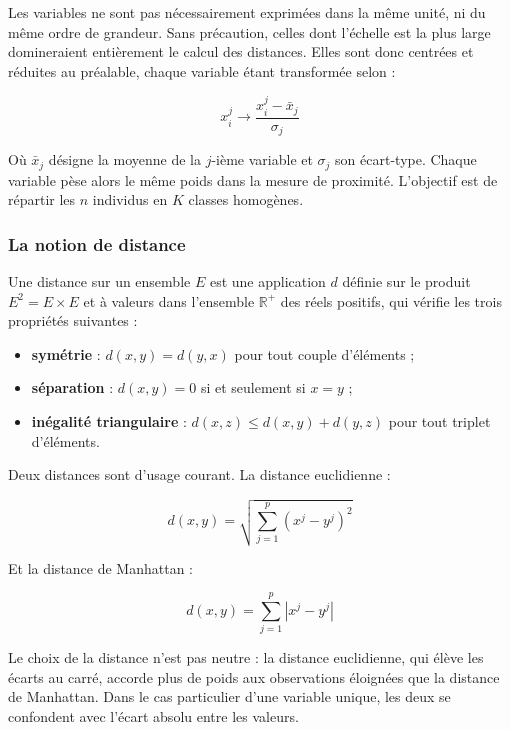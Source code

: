Les variables ne sont pas nécessairement exprimées dans la même unité, ni du même ordre de grandeur. Sans précaution, celles dont l'échelle est la plus large domineraient entièrement le calcul des distances. Elles sont donc centrées et réduites au préalable, chaque variable étant transformée selon :

\begin{equation}
    x_i^j \longrightarrow \frac{x_i^j - \bar{x}_j}{\sigma_j}
\end{equation}

Où $\bar{x}_j$ désigne la moyenne de la $j$-ième variable et $\sigma_j$ son écart-type. Chaque variable pèse alors le même poids dans la mesure de proximité. L'objectif est de répartir les $n$ individus en $K$ classes homogènes.

\subsubsection*{La notion de distance}

Une distance sur un ensemble $E$ est une application $d$ définie sur le produit $E^2 = E \times E$ et à valeurs dans l'ensemble $\mathbb{R}^+$ des réels positifs, qui vérifie les trois propriétés suivantes :

\begin{itemize}[label=$\bullet$]
    \item \textbf{symétrie} : $d(x, y) = d(y, x)$ pour tout couple d'éléments ;
    \item \textbf{séparation} : $d(x, y) = 0$ si et seulement si $x = y$ ;
    \item \textbf{inégalité triangulaire} : $d(x, z) \leq d(x, y) + d(y, z)$ pour tout triplet d'éléments.
\end{itemize}

Deux distances sont d'usage courant. La distance euclidienne :

\begin{equation}
    d(x, y) = \sqrt{\sum_{j=1}^{p} (x^j - y^j)^2}
\end{equation}

Et la distance de Manhattan :

\begin{equation}
    d(x, y) = \sum_{j=1}^{p} \left| x^j - y^j \right|
\end{equation}

Le choix de la distance n'est pas neutre : la distance euclidienne, qui élève les écarts au carré, accorde plus de poids aux observations éloignées que la distance de Manhattan. Dans le cas particulier d'une variable unique, les deux se confondent avec l'écart absolu entre les valeurs.

